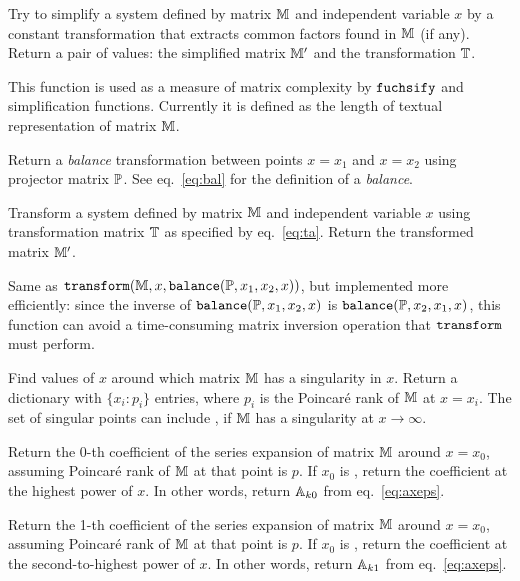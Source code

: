 \documentclass[12pt,a4paper]{article}
\begin{document}
\begin{description}[style=nextline]
Try to simplify a system defined by matrix $\mathbb{M}$ and independent variable $x$ by a constant transformation that extracts common factors found in $\mathbb{M}$ (if any).
Return a pair of values: the simplified matrix $\mathbb{M}'$ and the transformation $\mathbb{T}$.

This function is used as a measure of matrix complexity by $\texttt{fuchsify}$ and simplification functions.
Currently it is defined as the length of textual representation of matrix $\mathbb{M}$.

Return a \textit{balance} transformation between points $x=x_1$ and $x=x_2$ using projector matrix $\mathbb{P}$.
See eq.~\eqref{eq:bal} for the definition of a \textit{balance}.

Transform a system defined by matrix $\mathbb{M}$ and independent variable $x$ using transformation matrix $\mathbb{T}$ as specified by eq.~\eqref{eq:ta}.
Return the transformed matrix $\mathbb{M}'$.

Same as $\texttt{transform}(\mathbb{M}, x, \texttt{balance}(\mathbb{P}, x_1, x_2, x))$, but implemented more efficiently: since the inverse of $\texttt{balance}(\mathbb{P}, x_1, x_2, x)$ is $\texttt{balance}(\mathbb{P}, x_2, x_1, x)$, this function can avoid a time-consuming matrix inversion operation that $\texttt{transform}$ must perform.

Find values of $x$ around which matrix $\mathbb{M}$ has a singularity in $x$.
Return a dictionary with $\{x_i: p_i\}$ entries, where $p_i$ is the Poincar\'e rank of $\mathbb{M}$ at $x=x_i$.
The set of singular points can include , if $\mathbb{M}$ has a singularity at $x\to\infty$.

Return the 0-th coefficient of the series expansion of matrix $\mathbb{M}$ around $x=x_0$, assuming Poincar\'e rank of $\mathbb{M}$ at that point is $p$.
If $x_0$ is , return the coefficient at the highest power of $x$.
In other words, return $\mathbb{A}_{k0}$ from eq.~\eqref{eq:axeps}.

Return the 1-th coefficient of the series expansion of matrix $\mathbb{M}$ around $x=x_0$, assuming Poincar\'e rank of $\mathbb{M}$ at that point is $p$.
If $x_0$ is , return the coefficient at the second-to-highest power of $x$.
In other words, return $\mathbb{A}_{k1}$ from eq.~\eqref{eq:axeps}.


\end{description}
\end{document}
